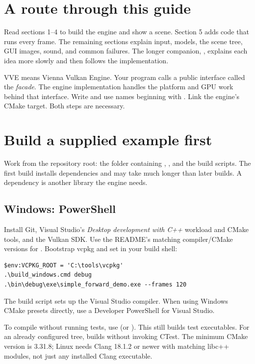 \documentclass[11pt,a4paper]{article}
\begin{document}

\section*{A route through this guide}
Read sections 1--4 to build the engine and show a scene. Section 5 adds code that runs every frame. The remaining sections explain input, models, the scene tree, GUI images, sound, and common failures. The longer companion, , explains each idea more slowly and then follows the implementation.

VVE means Vienna Vulkan Engine. Your program calls a public interface called the \emph{facade}. The engine implementation handles the platform and GPU work behind that interface. Write  and use names beginning with . Link the engine's CMake target. Both steps are necessary.

\section{Build a supplied example first}
Work from the repository root: the folder containing , , and the build scripts. The first build installs dependencies and may take much longer than later builds. A dependency is another library the engine needs.

\subsection*{Windows: PowerShell}
Install Git, Visual Studio's \emph{Desktop development with C++} workload and CMake tools, and the Vulkan SDK. Use the README's matching compiler/CMake versions for . Bootstrap vcpkg and set  in your build shell:
\begin{lstlisting}[language={}]
$env:VCPKG_ROOT = 'C:\tools\vcpkg'
.\build_windows.cmd debug
.\bin\debug\exe\simple_forward_demo.exe --frames 120
\end{lstlisting}
The build script sets up the Visual Studio compiler. When using Windows CMake presets directly, use a Developer PowerShell for Visual Studio.

To compile without running tests, use  (or ). This still builds test executables. For an already configured tree,  builds without invoking CTest. The minimum CMake version is 3.31.8; Linux needs Clang 18.1.2 or newer with matching libc++ modules, not just any installed Clang executable.
\end{document}
